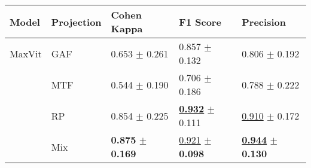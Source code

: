 
\begin{tabular}{lllll}
\toprule
Model & Projection & Cohen Kappa & F1 Score & Precision \\
\midrule
MaxVit & GAF & \textcolor[rgb]{0.6722689076,0.3277310924,0}{0.653} $\pm$ \textcolor[rgb]{1.0000000000,0.0000000000,0}{0.261} & \textcolor[rgb]{0.3311979500,0.5000000000,0}{0.857} $\pm$ \textcolor[rgb]{0.3783309468,0.5000000000,0}{0.132} & \textcolor[rgb]{0.8870967742,0.1129032258,0}{0.806} $\pm$ \textcolor[rgb]{0.6824753509,0.3175246491,0}{0.192} \\
 & MTF & \textcolor[rgb]{1.0000000000,0.0000000000,0}{0.544} $\pm$ \textcolor[rgb]{0.2378574494,0.5000000000,0}{0.190} & \textcolor[rgb]{1.0000000000,0.0000000000,0}{0.706} $\pm$ \textcolor[rgb]{1.0000000000,0.0000000000,0}{0.186} & \textcolor[rgb]{1.0000000000,0.0000000000,0}{0.788} $\pm$ \textcolor[rgb]{1.0000000000,0.0000000000,0}{0.222} \\
 & RP & \textcolor[rgb]{0.0630252101,0.5000000000,0}{0.854} $\pm$ \textcolor[rgb]{0.6134136341,0.3865863659,0}{0.225} & \underline{\textbf{\textcolor[rgb]{0.0000000000,0.5000000000,0}{0.932}}} $\pm$ \textcolor[rgb]{0.1465115097,0.5000000000,0}{0.111} & \underline{\textcolor[rgb]{0.2217741935,0.5000000000,0}{0.910}} $\pm$ \textcolor[rgb]{0.4609922199,0.5000000000,0}{0.172} \\
 & Mix & \textbf{\textcolor[rgb]{0.0000000000,0.5000000000,0}{0.875}} $\pm$ \textbf{\textcolor[rgb]{0.0000000000,0.5000000000,0}{0.169}} & \underline{\textcolor[rgb]{0.0458039718,0.5000000000,0}{0.921}} $\pm$ \textbf{\textcolor[rgb]{0.0000000000,0.5000000000,0}{0.098}} & \underline{\textbf{\textcolor[rgb]{0.0000000000,0.5000000000,0}{0.944}}} $\pm$ \textbf{\textcolor[rgb]{0.0000000000,0.5000000000,0}{0.130}} \\
\bottomrule
\end{tabular}

